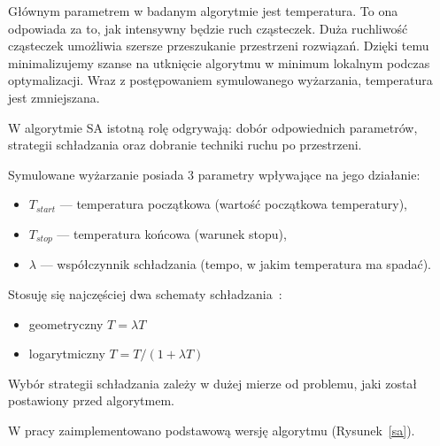 Głównym parametrem w badanym algorytmie jest temperatura. To ona odpowiada za to, jak intensywny będzie ruch cząsteczek. Duża ruchliwość cząsteczek umożliwia szersze przeszukanie przestrzeni rozwiązań. Dzięki temu minimalizujemy szanse na utknięcie algorytmu w minimum lokalnym podczas optymalizacji. Wraz z postępowaniem symulowanego wyżarzania, temperatura jest zmniejszana.

W algorytmie SA istotną rolę odgrywają: dobór odpowiednich parametrów, strategii schładzania oraz dobranie techniki ruchu po przestrzeni.

\breakparagraph{}
Symulowane wyżarzanie posiada 3 parametry wpływające na jego działanie:
\begin{itemize}
	\item $T_{start}$ --- temperatura początkowa (wartość początkowa temperatury),
	\item $T_{stop}$ --- temperatura końcowa (warunek stopu),
	\item $\lambda$ --- współczynnik schładzania (tempo, w jakim temperatura ma spadać).
\end{itemize}

\breakparagraph{}
Stosuję się najczęściej dwa schematy schładzania~\cite{Smutnicki2002As}:
\begin{itemize}
	\item geometryczny $T = \lambda T$
	\item logarytmiczny $T = T /(1 + \lambda T)$
\end{itemize}

Wybór strategii schładzania zależy w dużej mierze od problemu, jaki został postawiony przed algorytmem.

\breakparagraph{}
W pracy zaimplementowano podstawową wersję algorytmu (Rysunek~\ref{sa}).
\raggedbottom{}


